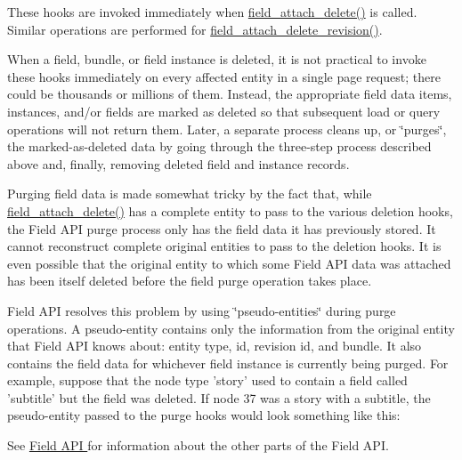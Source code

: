 These hooks are invoked immediately when \hyperlink{group__field__attach_gac2e3658c9c02d0d0e71359f9ef2f207a}{field\_\-attach\_\-delete()} is called. Similar operations are performed for \hyperlink{group__field__attach_gaa9eae65e6d9f1996cb27a55ba25b56e9}{field\_\-attach\_\-delete\_\-revision()}.

When a field, bundle, or field instance is deleted, it is not practical to invoke these hooks immediately on every affected entity in a single page request; there could be thousands or millions of them. Instead, the appropriate field data items, instances, and/or fields are marked as deleted so that subsequent load or query operations will not return them. Later, a separate process cleans up, or \char`\"{}purges\char`\"{}, the marked-\/as-\/deleted data by going through the three-\/step process described above and, finally, removing deleted field and instance records.

Purging field data is made somewhat tricky by the fact that, while \hyperlink{group__field__attach_gac2e3658c9c02d0d0e71359f9ef2f207a}{field\_\-attach\_\-delete()} has a complete entity to pass to the various deletion hooks, the Field API purge process only has the field data it has previously stored. It cannot reconstruct complete original entities to pass to the deletion hooks. It is even possible that the original entity to which some Field API data was attached has been itself deleted before the field purge operation takes place.

Field API resolves this problem by using \char`\"{}pseudo-\/entities\char`\"{} during purge operations. A pseudo-\/entity contains only the information from the original entity that Field API knows about: entity type, id, revision id, and bundle. It also contains the field data for whichever field instance is currently being purged. For example, suppose that the node type 'story' used to contain a field called 'subtitle' but the field was deleted. If node 37 was a story with a subtitle, the pseudo-\/entity passed to the purge hooks would look something like this:




See \hyperlink{group__field}{Field API } for information about the other parts of the Field API. 

